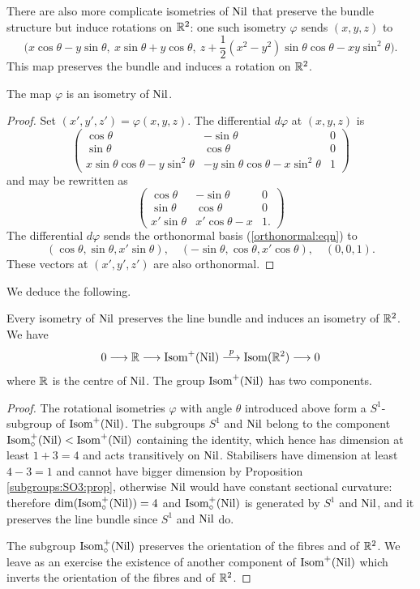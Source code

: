 There are also more complicate isometries of ${\rm Nil}$ that preserve the bundle structure but induce rotations on $\mathbb{R}^2$: one such isometry $\varphi$ sends $(x,y,z)$ to 
$$\Big(x\cos\theta -y\sin \theta, \  x\sin \theta + y \cos \theta,\ z+ \frac 12 (x^2-y^2)\sin \theta \cos \theta - xy\sin^2 \theta \Big).$$
This map preserves the bundle and induces a rotation on $\mathbb{R}^2$.
\begin{prop} \label{varphi:isometry:prop}
The map $\varphi$ is an isometry of ${\rm Nil}$.
\end{prop}
\begin{proof}
Set $(x',y',z') = \varphi (x,y,z)$. The differential $d\varphi$ at $(x,y,z)$ is
$$
\begin{pmatrix} 
\cos \theta & -\sin \theta & 0 \\
\sin \theta & \cos \theta & 0 \\
x\sin\theta \cos\theta - y\sin^2 \theta & - y\sin\theta\cos \theta  - x\sin^2\theta & 1 
\end{pmatrix} 
$$
and may be rewritten as
$$
\begin{pmatrix} 
\cos \theta & -\sin \theta & 0 \\
\sin \theta & \cos \theta & 0 \\
x'\sin \theta & x'\cos \theta - x & 1.
\end{pmatrix} 
$$
The differential $d\varphi$ sends the orthonormal basis (\ref{orthonormal:eqn}) to
$$(\cos\theta, \sin \theta, x'\sin\theta), \quad (-\sin\theta, \cos\theta, x'\cos\theta), \quad (0,0,1).$$
These vectors at $(x',y',z')$ are also orthonormal.
\end{proof}

We deduce the following.

\begin{prop} \label{Nil:isometries:prop}
Every isometry of ${\rm Nil}$ preserves the line bundle and induces an isometry of $\mathbb{R}^2$. We have
$$0 \longrightarrow \mathbb{R} \longrightarrow {\rm Isom}^+({\rm Nil}) \stackrel p \longrightarrow {\rm Isom}(\mathbb{R}^2) \longrightarrow 0$$
where $\mathbb{R}$ is the centre of ${\rm Nil}$.
The group ${\rm Isom}^+({\rm Nil})$ has two components.
\end{prop}
\begin{proof}
The rotational isometries $\varphi$ with angle $\theta$ introduced above form a $S^1$-subgroup of ${\rm Isom}^+({\rm Nil})$. The subgroups $S^1$ and ${\rm Nil}$ belong to the component ${\rm Isom}^+_\circ({\rm Nil}) < {\rm Isom}^+({\rm Nil})$ containing the identity, which hence has dimension at least $1+3=4$ and acts transitively on ${\rm Nil}$. Stabilisers have dimension at least $4-3=1$ and cannot have bigger dimension by Proposition \ref{subgroups:SO3:prop}, otherwise ${\rm Nil}$ would have constant sectional curvature: therefore $\dim({\rm Isom}^+_\circ({\rm Nil}))=4$ and ${\rm Isom}^+_\circ({\rm Nil})$ is generated by $S^1$ and ${\rm Nil}$, and it preserves the line bundle since $S^1$ and ${\rm Nil}$ do.

The subgroup ${\rm Isom}^+_\circ({\rm Nil})$ preserves the orientation of the fibres and of $\mathbb{R}^2$.
We leave as an exercise the existence of another component of ${\rm Isom}^+({\rm Nil})$ which inverts the orientation of the fibres and of $\mathbb{R}^2$.
\end{proof}

